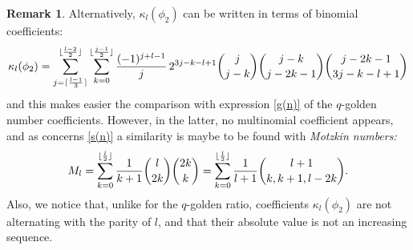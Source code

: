\documentclass[11pt,reqno]{amsart}
\theoremstyle{plain}
\theoremstyle{definition}
\newtheorem{remarque}[lemme]{Remark}
\numberwithin{figure}{section}
\numberwithin{table}{section}
\numberwithin{equation}{section}
\newcommand\ka{\kappa}
\let\fr=\frac
\DeclarePairedDelimiter{\ceil}{\lceil}{\rceil}%
\DeclarePairedDelimiter{\floor}{\lfloor}{\rfloor}%
\begin{document}
\begin{remarque}\label{rem:s(n)}
Alternatively, $\ka_l(\phi_2)$ can be written in terms of binomial coefficients:
\begin{equation*}
\ka_l(\phi_2)=\sum_{j=\ceil{\fr{l-1}{3}}}^{\floor{\fr{l-2}{2}}} 
\sum_{k=0}^{\floor{\fr{j-1}{2}}}\fr{(-1)^{j+l-1}}{j} \,2^{3j-k-l+1}
\binom{j}{j-k}\binom{j-k}{j-2k-1}\binom{j-2k-1}{3j-k-l+1}
\end{equation*}
and this makes easier the comparison with  expression \eqref{g(n)} of the $q$-golden number coefficients. However, in the latter, no multinomial coefficient appears, and as concerns \eqref{s(n)} a similarity is maybe to be found with \emph{Motzkin numbers:}
\begin{equation*}
M_l=\sum_{k=0}^{\floor{\fr{l}{2}}}\fr{1}{k+1}\binom{l}{2k}\binom{2k}{k}
=\sum_{k=0}^{\floor{\fr{l}{2}}}\fr{1}{l+1}\binom{l+1}{k,k+1,l-2k}.
\end{equation*} 
Also, we notice that, unlike for the $q$-golden ratio,  coefficients $\ka_l(\phi_2)$  are not alternating with the parity of $l$, and that their absolute value is not an increasing sequence.
\end{remarque}
\end{document}
